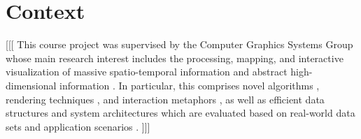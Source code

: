 

\section{Context}
\label{sec:Context}
[[[ This course project was supervised by the Computer Graphics Systems Group whose main research interest includes the processing, mapping, and interactive visualization of massive spatio-temporal information \cite{Oehlke2015,Buschmann2015,Buschmann2014,Maass2006} and abstract high-dimensional information \cite{Limberger2017,Limberger2016,Wuerfel2015}. In particular, this comprises novel algorithms \cite{RichterKyprianidis2013,RichterBehrens2013,Glander2012}, rendering techniques \cite{Semmo2016,Pasewaldt2014,Maass2006a,Doellner2005}, and interaction metaphors \cite{Semmo2016a,Scheibel2016,Semmo2014}, as well as efficient data structures \cite{Scheibel2017,Richter2015} and system architectures \cite{Klimke2014,Trapp2012,Klimke2010} which are evaluated based on real-world data sets and application scenarios \cite{Discher2016,Trapp2015,Engel2012}. ]]]
